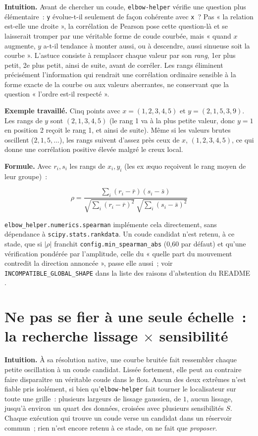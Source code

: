 \documentclass[11pt]{article}
\newcommand{\code}[1]{\texttt{#1}}
\begin{document}
\textbf{Intuition.} Avant de chercher un coude, \code{elbow-helper}
vérifie une question plus élémentaire~: \code{y} évolue-t-il seulement de
façon cohérente avec \code{x}~? Pas « la relation est-elle une droite », la
corrélation de Pearson pose cette question-là et se laisserait tromper par
une véritable forme de coude courbée, mais « quand $x$ augmente, $y$ a-t-il
tendance à monter aussi, ou à descendre, aussi sinueuse soit la courbe ».
L'astuce consiste à remplacer chaque valeur par son \emph{rang}, 1er plus
petit, 2e plus petit, ainsi de suite, avant de corréler. Les rangs
éliminent précisément l'information qui rendrait une corrélation ordinaire
sensible à la forme exacte de la courbe ou aux valeurs aberrantes, ne
conservant que la question « l'ordre est-il respecté ».

\textbf{Exemple travaillé.} Cinq points avec $x = (1,2,3,4,5)$ et $y =
(2,1,5,3,9)$. Les rangs de $y$ sont $(2,1,3,4,5)$ (le rang 1 va à la plus
petite valeur, donc $y=1$ en position 2 reçoit le rang 1, et ainsi de
suite). Même si les valeurs brutes oscillent ($2, 1, 5, \dots$), les rangs
suivent d'assez près ceux de $x$, $(1,2,3,4,5)$, ce qui donne une
corrélation positive élevée malgré le creux local.

\textbf{Formule.} Avec $r_i, s_i$ les rangs de $x_i, y_i$ (les ex æquo
reçoivent le rang moyen de leur groupe)~:

\begin{equation}
\rho = \frac{\sum_i (r_i - \bar r)(s_i - \bar s)}{\sqrt{\sum_i (r_i - \bar r)^2}\ \sqrt{\sum_i (s_i - \bar s)^2}}
\end{equation}

\code{elbow\_helper.numerics.spearman} implémente cela directement, sans
dépendance à \code{scipy.stats.rankdata}. Un coude candidat n'est retenu, à
ce stade, que si $|\rho|$ franchit \code{config.min\_spearman\_abs} (0,60
par défaut) et qu'une vérification pondérée par l'amplitude, celle du
« quelle part du mouvement contredit la direction annoncée », passe elle
aussi~; voir \code{INCOMPATIBLE\_GLOBAL\_SHAPE} dans la liste des raisons
d'abstention du README \citep{spearman1904}.

\section{Ne pas se fier à une seule échelle~: la recherche lissage $\times$ sensibilité}
\label{sec:multiechelle}

\textbf{Intuition.} À sa résolution native, une courbe bruitée fait
ressembler chaque petite oscillation à un coude candidat. Lissée fortement,
elle peut au contraire faire disparaître un véritable coude dans le flou.
Aucun des deux extrêmes n'est fiable pris isolément, si bien
qu'\code{elbow-helper} fait tourner le localisateur sur toute une grille~:
plusieurs largeurs de lissage gaussien, de $1$, aucun lissage, jusqu'à
environ un quart des données, croisées avec plusieurs sensibilités $S$.
Chaque exécution qui trouve un coude verse un candidat dans un réservoir
commun~; rien n'est encore retenu à ce stade, on ne fait que
\emph{proposer}.
\end{document}
